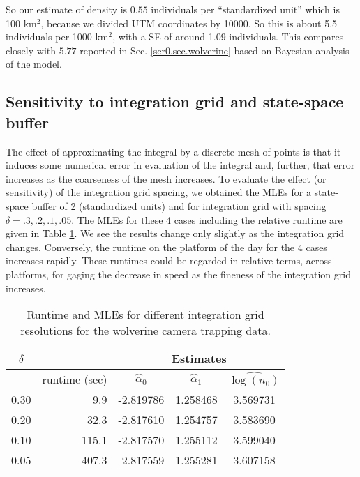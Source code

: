So our estimate of density is $0.55$ individuals per ``standardized
unit'' which is 100 km$^2$, because we divided UTM coordinates by
10000.  So this is about 5.5 individuals per 1000 km$^2$,
with a SE of around 1.09
individuals.  This compares closely with $5.77$
reported in
Sec. \ref{scr0.sec.wolverine} based on Bayesian
analysis of the model.


\subsection{Sensitivity to integration grid and state-space buffer}

The effect of approximating the integral by a discrete mesh of points
is that it induces some numerical error in evaluation of the integral
and, further, that error increases as the
coarseness of the mesh increases. 
To evaluate the effect (or sensitivity) of the integration grid
spacing, 
we obtained the MLEs for a state-space buffer of 2 (standardized
units) and for integration grid with spacing $\delta = .3, .2, .1,
.05$. The MLEs for these 4 cases including the relative runtime are
given in Table \ref{mle.tab.integration}.
We see the results change only slightly as the
integration grid changes. Conversely, the runtime on the platform of
the day for the 4 cases increases rapidly. 
These runtimes could be regarded in
relative terms,  across platforms, for gaging the decrease in
speed as the fineness of the integration grid increases.

\begin{table}[ht]
\centering
\caption{Runtime and MLEs for different integration grid resolutions
  for the wolverine camera trapping data.}
\begin{tabular}{crccc}
\hline \hline
$\delta$ &   & \multicolumn{3}{c}{Estimates} \\ \hline
         &  runtime (sec)       & $\hat{\alpha}_0$ & $\hat{\alpha}_1$ &  $\widehat{\log(n_0)}$ \\ \hline
 0.30   &  9.9  &  -2.819786 & 1.258468 & 3.569731  \\
 0.20   & 32.3  &  -2.817610 & 1.254757 & 3.583690 \\
 0.10  & 115.1  &  -2.817570 & 1.255112 & 3.599040 \\
 0.05 &  407.3 &   -2.817559&  1.255281&  3.607158 \\ \hline
\end{tabular}
\label{mle.tab.integration}
\end{table}

